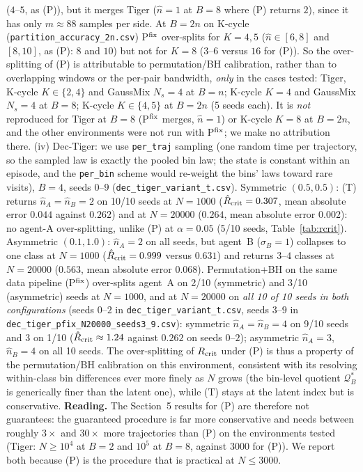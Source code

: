 \documentclass[10pt]{article}
\newcommand{\Qstar}{\mathcal{Q}^*}
\begin{document}
($4$--$5$, as (P)), but it merges Tiger ($\hat n=1$ at $B=8$ where (P) returns $2$), since
it has only $m\approx88$ samples per side.  At $B=2n$ on K-cycle
(\texttt{partition\_accuracy\_2n.csv}) P$^{\rm fix}$ over-splits for $K=4,5$
($\hat n\in[6,8]$ and $[8,10]$, as (P): $8$ and $10$) but not for $K=8$
($3$--$6$ versus $16$ for (P)).  So the over-splitting of (P) is attributable to
permutation/BH calibration, rather than to overlapping windows or the per-pair
bandwidth, \emph{only} in the cases tested: Tiger, K-cycle $K\in\{2,4\}$ and GaussMix
$N_s=4$ at $B=n$; K-cycle $K=4$ and GaussMix $N_s=4$ at $B=8$; K-cycle $K\in\{4,5\}$
at $B=2n$ (5 seeds each).  It is \emph{not} reproduced for Tiger at $B=8$
(P$^{\rm fix}$ merges, $\hat n=1$) or K-cycle $K=8$ at $B=2n$, and the other
environments were not run with P$^{\rm fix}$; we make no attribution there.
(iv) Dec-Tiger:
we use \texttt{per\_traj} sampling (one random time per trajectory, so the
sampled law is exactly the pooled bin law; the state is constant within an
episode, and the \texttt{per\_bin} scheme would re-weight the bins' laws
toward rare visits), $B=4$, seeds $0$--$9$ (\texttt{dec\_tiger\_variant\_t.csv}).
Symmetric $(0.5,0.5)$: (T) returns $\hat n_A=\hat n_B=2$ on 10/10 seeds at $N=1000$
($\hat R_{\rm crit}=0.307$, mean absolute error $0.044$ against $0.262$) and at
$N=20000$ ($0.264$, mean absolute error $0.002$): no agent-A over-splitting,
unlike (P) at $\alpha=0.05$ (5/10 seeds, Table~\ref{tab:rcrit}).  Asymmetric
$(0.1,1.0)$: $\hat n_A=2$ on all seeds, but agent~B ($\sigma_B=1$) collapses to one
class at $N=1000$ ($\hat R_{\rm crit}=0.999$ versus $0.631$) and returns $3$--$4$ classes at
$N=20000$ ($0.563$, mean absolute error $0.068$).  Permutation+BH on the same
data pipeline (P$^{\rm fix}$) over-splits agent~A on 2/10 (symmetric) and 3/10
(asymmetric) seeds at $N=1000$, and at $N=20000$ on \emph{all 10 of 10 seeds in
both configurations} (seeds $0$--$2$ in \texttt{dec\_tiger\_variant\_t.csv}, seeds
$3$--$9$ in \texttt{dec\_tiger\_pfix\_N20000\_seeds3\_9.csv}): symmetric
$\hat n_A=\hat n_B=4$ on 9/10 seeds and $3$ on 1/10 ($\hat R_{\rm crit}\approx1.24$ against
$0.262$ on seeds $0$--$2$); asymmetric $\hat n_A=3$, $\hat n_B=4$ on all 10 seeds.
The over-splitting of $R_{\rm crit}$ under (P) is thus a
property of the permutation/BH calibration on this environment, consistent with its resolving
within-class bin differences ever more finely as $N$ grows (the bin-level quotient
$\Qstar_B$ is generically finer than the latent one), while (T) stays at the
latent index but is conservative.
\textbf{Reading.}  The Section~5 results for (P) are therefore not guarantees: the
guaranteed procedure is far more conservative and needs between roughly $3\times$ and
$30\times$ more trajectories than (P) on the environments tested
(Tiger: $N\ge10^4$ at $B=2$ and $10^5$ at $B=8$, against $3000$ for (P)).  We report
both because (P) is the procedure that is practical at $N\le3000$.
\end{document}
